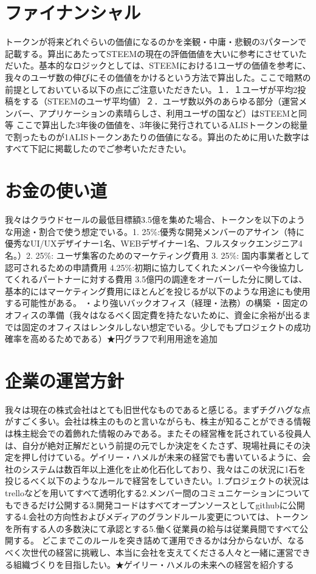 \documentclass{jsarticle}
\begin{document}
\section{ファイナンシャル}
トークンが将来どれぐらいの価値になるのかを楽観・中庸・悲観の3パターンで記載する。算出にあたってSTEEMの現在の評価価値を大いに参考にさせていただいた。基本的なロジックとしては、STEEMにおける1ユーザの価値を参考に、我々のユーザ数の伸びにその価値をかけるという方法で算出した。ここで暗黙の前提としておいている以下の点にご注意いただきたい。１．１ユーザが平均2投稿をする（STEEMのユーザ平均値）２．ユーザ数以外のあらゆる部分（運営メンバー、アプリケーションの素晴らしさ、利用ユーザの国など）はSTEEMと同等 ここで算出した3年後の価値を、3年後に発行されているALISトークンの総量で割ったものが1ALISトークンあたりの価値になる。算出のために用いた数字はすべて下記に掲載したのでご参考いただきたい。
\section{お金の使い道}
我々はクラウドセールの最低目標額3.5億を集めた場合、トークンを以下のような用途・割合で使う想定でいる。1. 25\%:優秀な開発メンバーのアサイン（特に優秀なUI/UXデザイナー1名、WEBデザイナー1名、フルスタックエンジニア4名。）2. 25\%: ユーザ集客のためのマーケティング費用 3. 25\%: 国内事業者として認可されるための申請費用 4.25\%:初期に協力してくれたメンバーや今後協力してくれるパートナーに対する費用 3.5億円の調達をオーバーした分に関しては、基本的にはマーケティング費用にほとんどを投じるが以下のような用途にも使用する可能性がある。 ・より強いバックオフィス（経理・法務）の構築 ・固定のオフィスの準備（我々はなるべく固定費を持たないために、資金に余裕が出るまでは固定のオフィスはレンタルしない想定でいる。少しでもプロジェクトの成功確率を高めるためである）★円グラフで利用用途を追加
\section{企業の運営方針}
我々は現在の株式会社はとても旧世代なものであると感じる。まずチグハグな点がすごく多い。会社は株主のものと言いながらも、株主が知ることができる情報は株主総会での着飾れた情報のみである。またその経営権を託されている役員人は、自分が絶対正解だという前提の元でしか決定をくたさず、現場社員にその決定を押し付けている。ゲイリー・ハメルが未来の経営でも書いているように、会社のシステムは数百年以上進化を止め化石化しており、我々はこの状況に1石を投じるべく以下のようなルールで経営をしていきたい。1.プロジェクトの状況はtrelloなどを用いてすべて透明化する2.メンバー間のコミュニケーションについてもできるだけ公開する3.開発コードはすべてオープンソースとしてgithubに公開する4.会社の方向性およびメディアのグランドルール変更については、トークンを所有する人の多数決にて承認とする5.働く従業員の給与は従業員間ですべて公開する。 どこまでこのルールを突き詰めて運用できるかは分からないが、なるべく次世代の経営に挑戦し、本当に会社を支えてくださる人々と一緒に運営できる組織づくりを目指したい。★ゲイリー・ハメルの未来への経営を紹介する
\end{document}
